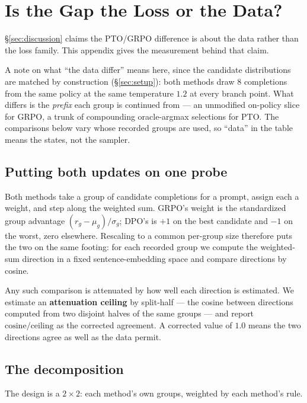 \section{Is the Gap the Loss or the Data?}
\label{app:probe}

\S\ref{sec:discussion} claims the PTO/GRPO difference is about the data rather than the loss
family. This appendix gives the measurement behind that claim.

A note on what ``the data differ'' means here, since the candidate distributions are matched by
construction (\S\ref{sec:setup}): both methods draw $8$ completions from the same policy at the
same temperature $1.2$ at every branch point. What differs is the \emph{prefix} each group is
continued from --- an unmodified on-policy slice for GRPO, a trunk of compounding oracle-argmax
selections for PTO. The comparisons below vary whose recorded groups are used, so ``data'' in
the table means the states, not the sampler.

\subsection{Putting both updates on one probe}
Both methods take a group of candidate completions for a prompt, assign each a weight, and step
along the weighted sum. GRPO's weight is the standardized group advantage
$(r_g-\mu_g)/\sigma_g$; DPO's is $+1$ on the best candidate and $-1$ on the worst, zero
elsewhere. Rescaling to a common per-group size therefore puts the two on the same footing: for
each recorded group we compute the weighted-sum direction in a fixed sentence-embedding space and
compare directions by cosine.

Any such comparison is attenuated by how well each direction is estimated. We estimate an
\textbf{attenuation ceiling} by split-half --- the cosine between directions computed from two
disjoint halves of the same groups --- and report $\text{cosine}/\text{ceiling}$ as the corrected
agreement. A corrected value of $1.0$ means the two directions agree as well as the data permit.

\subsection{The decomposition}
The design is a $2\times2$: each method's own groups, weighted by each method's rule.

